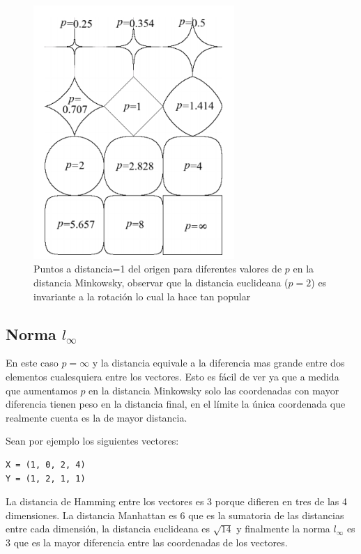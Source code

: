 \begin{figure}[!htb]
\centering
\includegraphics[width=3in]{figures/balls-fig-1}

\caption{Puntos a distancia=1 del origen para diferentes valores de $p$ en la distancia Minkowsky, observar que la distancia euclideana ($p=2$) es invariante a la rotación lo cual la hace tan popular}
\label{fig:minkowsky}
\end{figure}


\subsection{Norma $l_{\infty}$} En este caso $p=\infty$ y la distancia equivale a la diferencia mas grande entre dos elementos cualesquiera entre los vectores. Esto es fácil de ver ya que a medida que aumentamos $p$ en la distancia Minkowsky solo las coordenadas con mayor diferencia tienen peso en la distancia final, en el límite la única coordenada que realmente cuenta es la de mayor distancia.

Sean por ejemplo los siguientes vectores:

\begin{verbatim}
X = (1, 0, 2, 4)
Y = (1, 2, 1, 1)
\end{verbatim}

La distancia de Hamming entre los vectores es 3 porque difieren en tres de las 4 dimensiones. La distancia Manhattan es 6 que es la sumatoria de las distancias entre cada dimensión, la distancia euclideana es $\sqrt{14}$ y finalmente la norma $l_{\infty}$ es 3 que es la mayor diferencia entre las coordenadas de los vectores.



